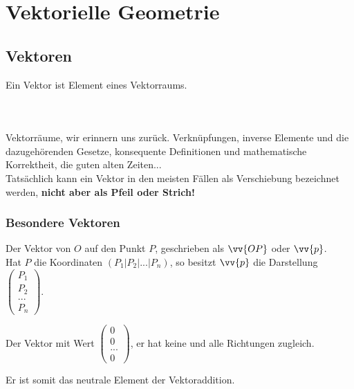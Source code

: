 \documentclass[main.tex]{subfiles}
\begin{document}
\chapter{Vektorielle Geometrie}

\section{Vektoren}

    \begin{Definition}
        Ein Vektor ist Element eines Vektorraums.
    \end{Definition}
    \\

    \paragraph{} Vektorräume, wir erinnern uns zurück. Verknüpfungen, inverse Elemente und die dazugehörenden Gesetze, konsequente Definitionen und
    mathematische Korrektheit, die guten alten Zeiten...\\
    Tatsächlich kann ein Vektor in den meisten Fällen als Verschiebung bezeichnet werden, \textbf{nicht aber als Pfeil oder Strich!}\\


    \subsection{Besondere Vektoren}
      \begin{Definition}
        Der Vektor von $O$ auf den Punkt $P$, geschrieben als $\vv{OP}$ oder $\vv{p}$.
        \\
        Hat $P$ die Koordinaten $(P_1|P_2|...|P_n)$, so besitzt $\vv{p}$ die Darstellung $\left(\begin{array}{c} P_1 \\ P_2 \\ ...\\P_n\end{array}\right)$.
      \end{Definition}

      \begin{Definition}
        Der Vektor mit Wert $\left(\begin{array}{c} 0 \\ 0 \\ ...\\0\end{array}\right)$, er hat keine und alle Richtungen zugleich.
      \end{Definition}
      \begin{Bemerkung}
        Er ist somit das neutrale Element der Vektoraddition.
      \end{Bemerkung}
\end{document}
